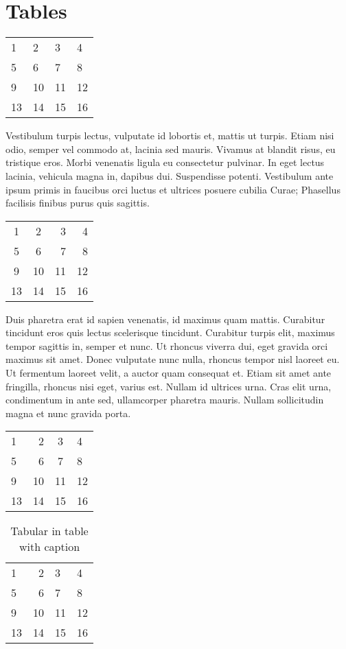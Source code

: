 \chapter{Tables}
\begin{tabular}{llll}
 1&2&3&4\\
 5&6&7&8\\
 9&10&11&12\\
 13&14&15&16
\end{tabular}

Vestibulum turpis lectus, vulputate id lobortis et, mattis ut turpis. Etiam nisi odio, semper vel commodo at, lacinia sed mauris. Vivamus at blandit risus, eu tristique eros. Morbi venenatis ligula eu consectetur pulvinar. In eget lectus lacinia, vehicula magna in, dapibus dui. Suspendisse potenti. Vestibulum ante ipsum primis in faucibus orci luctus et ultrices posuere cubilia Curae; Phasellus facilisis finibus purus quis sagittis.

\begin{tabular}{ccrr}
 1&2&3&4\\
 5&6&7&8\\
 9&10&11&12\\
 13&14&15&16
\end{tabular}

Duis pharetra erat id sapien venenatis, id maximus quam mattis. Curabitur tincidunt eros quis lectus scelerisque tincidunt. Curabitur turpis elit, maximus tempor sagittis in, semper et nunc. Ut rhoncus viverra dui, eget gravida orci maximus sit amet. Donec vulputate nunc nulla, rhoncus tempor nisl laoreet eu. Ut fermentum laoreet velit, a auctor quam consequat et. Etiam sit amet ante fringilla, rhoncus nisi eget, varius est. Nullam id ultrices urna. Cras elit urna, condimentum in ante sed, ullamcorper pharetra mauris. Nullam sollicitudin magna et nunc gravida porta. 

\begin{tabular}{p{5cm}rcl}
 1&2&3&4\\
 5&6&7&8\\
 9&10&11&12\\
 13&14&15&16
\end{tabular}

\begin{table}
\begin{tabular}{p{2cm}rp{2cm}l}
 1&2&3&4\\
 5&6&7&8\\
 9&10&11&12\\
 13&14&15&16
\end{tabular}
\caption{Tabular in table with caption}
\label{tab:intro}
\end{table}

